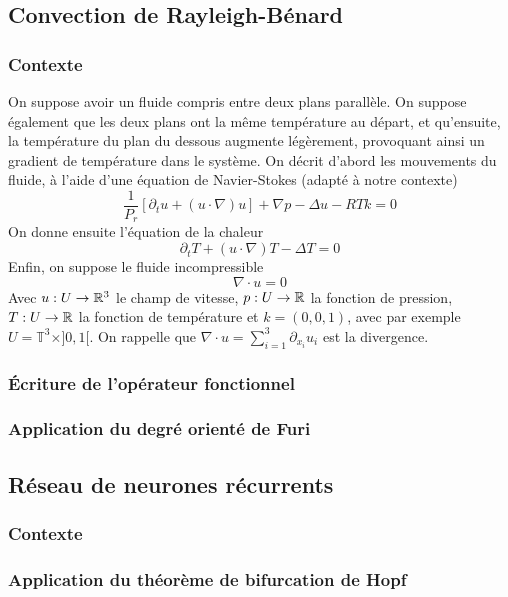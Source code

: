 \documentclass[memoire.tex]{subfiles}
\begin{document}
\subsection{Convection de Rayleigh-Bénard}
\subsubsection*{Contexte}
On suppose avoir un fluide compris entre deux plans parallèle. On suppose également que les deux plans ont la même température au départ, et qu'ensuite, la température du plan du dessous augmente légèrement, provoquant ainsi un gradient de température dans le système.
On décrit d'abord les mouvements du fluide, à l'aide d'une équation de Navier-Stokes (adapté à notre contexte)
\begin{equation*}
    \frac{1}{P_r}\left[\partial_tu +(u\cdot\nabla)u\right]+\nabla p-\Delta u-RTk=0
\end{equation*}
On donne ensuite l'équation de la chaleur
\begin{equation*}
    \partial_t T+ (u\cdot \nabla)T-\Delta T=0
\end{equation*}
Enfin, on suppose le fluide incompressible
\begin{equation*}
    \nabla\cdot u=0
\end{equation*}
Avec $u:U\rightarrow\mathbb{R}^3$ le champ de vitesse, $p:U\rightarrow\mathbb{R}$ la fonction de pression, $T:U\rightarrow\mathbb{R}$ la fonction de température et $k=(0,0,1)$, avec par exemple $U=\mathbb{T}^3\times ]0,1[$.
On rappelle que $\nabla\cdot u=\sum_{i=1}^3\partial_{x_i} u_i$ est la divergence.
\subsubsection*{Écriture de l'opérateur fonctionnel}
\subsubsection*{Application du degré orienté de Furi}
\subsection{Réseau de neurones récurrents}
\subsubsection*{Contexte}
\subsubsection*{Application du théorème de bifurcation de Hopf}

\newpage
\end{document}
